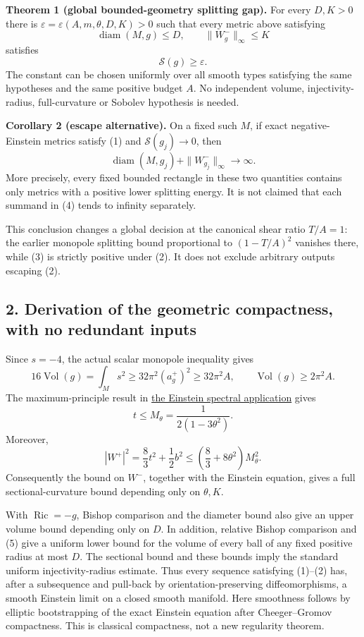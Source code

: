 \documentclass[
  11pt,
]{article}
\begin{document}
\textbf{Theorem 1 (global bounded-geometry splitting gap).} For every
\(D,K>0\) there is \(\varepsilon=\varepsilon(A,m,\theta,D,K)>0\) such
that every metric above satisfying \[
              \operatorname{diam}(M,g)\le D,
              \qquad \|W_g^-\|_\infty\le K                 \tag{2}
\] satisfies \[
                         \mathscr S(g)\ge\varepsilon.       \tag{3}
\] The constant can be chosen uniformly over all smooth types satisfying
the same hypotheses and the same positive budget \(A\). No independent
volume, injectivity-radius, full-curvature or Sobolev hypothesis is
needed.

\textbf{Corollary 2 (escape alternative).} On a fixed such \(M\), if
exact negative-Einstein metrics satisfy (1) and \(\mathscr S(g_j)\to0\),
then \[
       \operatorname{diam}(M,g_j)+\|W^-_{g_j}\|_\infty
                         \longrightarrow\infty.            \tag{4}
\] More precisely, every fixed bounded rectangle in these two quantities
contains only metrics with a positive lower splitting energy. It is not
claimed that each summand in (4) tends to infinity separately.

This conclusion changes a global decision at the canonical shear ratio
\(T/A=1\): the earlier monopole splitting bound proportional to
\((1-T/A)^2\) vanishes there, while (3) is strictly positive under (2).
It does not exclude arbitrary outputs escaping (2).

\hypertarget{derivation-of-the-geometric-compactness-with-no-redundant-inputs}{%
\subsection{2. Derivation of the geometric compactness, with no
redundant
inputs}\label{derivation-of-the-geometric-compactness-with-no-redundant-inputs}}

Since \(s=-4\), the actual scalar monopole inequality gives \[
 16\operatorname{Vol}(g)=\int_M s^2
       \ge32\pi^2(a_g^+)^2\ge32\pi^2A,
 \qquad \operatorname{Vol}(g)\ge2\pi^2A.                    \tag{5}
\] The maximum-principle result in
\href{line1_einstein_spectral_application.md}{the Einstein spectral
application} gives \[
        t\le M_\theta=\frac1{2(1-3\theta^2)}.              \tag{6}
\] Moreover, \[
 |W^+|^2=\frac83t^2+\frac12b^2
       \le\left(\frac83+8\theta^2\right)M_\theta^2.        \tag{7}
\] Consequently the bound on \(W^-\), together with the Einstein
equation, gives a full sectional-curvature bound depending only on
\(\theta,K\).

With \(\operatorname{Ric}=-g\), Bishop comparison and the diameter bound
also give an upper volume bound depending only on \(D\). In addition,
relative Bishop comparison and (5) give a uniform lower bound for the
volume of every ball of any fixed positive radius at most \(D\). The
sectional bound and these bounds imply the standard uniform
injectivity-radius estimate. Thus every sequence satisfying (1)--(2)
has, after a subsequence and pull-back by orientation-preserving
diffeomorphisms, a smooth Einstein limit on a closed smooth manifold.
Here smoothness follows by elliptic bootstrapping of the exact Einstein
equation after Cheeger--Gromov compactness. This is classical
compactness, not a new regularity theorem.
\end{document}
